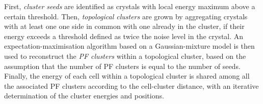 \label{sec:clusters}
First, \textit{cluster seeds} are identified as crystals with local energy maximum above a certain threshold.
Then, \textit{topological clusters} are grown by aggregating crystals with at least one one side in common with one already in the cluster,
if their energy exceeds a threshold defined as twice the noise level in the crystal.
An expectation-maximisation algorithm based on a Gaussian-mixture model is then used to reconstruct the \textit{PF clusters} within a topological cluster,
based on the assumption that the number of PF clusters is equal to the number of seeds.
Finally, the energy of each cell within a topological cluster is shared among all the associated PF clusters according to the cell-cluster distance,
with an iterative determination of the cluster energies and positions.
